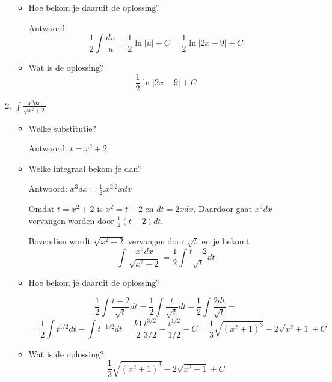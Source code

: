 \documentclass{article}
\begin{document}
\begin{enumerate}
\begin{itemize}
\item Hoe bekom je daaruit de oplossing?

Antwoord:
\[
\frac{1}{2} \int \frac{du}{u}=\frac{1}{2} \ln \vert u \vert+C=\frac{1}{2} \ln \vert 2x-9 \vert +C
\]

\item Wat is de oplossing?
\[
\frac{1}{2} \ln \vert 2x-9 \vert +C
\]

\end{itemize}

\item $\int \frac{x^3dx}{\sqrt{x^2+2}}$

\begin{itemize}
\item Welke substitutie?

Antwoord: $t=x^2+2$

\item Welke integraal bekom je dan?

Antwoord: $x^3dx=\frac{1}{2}.x^2.2xdx$

Omdat $t=x^2+2$ is $x^2=t-2$ en $dt=2xdx$.
Daardoor gaat $x^3dx$ vervangen worden door $\frac{1}{2}(t-2)dt$.

Bovendien wordt $\sqrt{x^2+2}$ vervangen door $\sqrt{t}$ en je bekomt
\[
\int \frac{x^3dx}{\sqrt{x^2+2}}=\frac{1}{2} \int \frac{t-2}{\sqrt{t}}dt
\]

\item Hoe bekom je daaruit de oplossing?

\[
\frac{1}{2} \int \frac{t-2}{\sqrt{t}}dt=\frac{1}{2} \int \frac{t}{\sqrt{t}}dt - \frac{1}{2}\int \frac{2dt}{\sqrt{t}}=
\]
\[
=\frac{1}{2} \int t^{1/2}dt - \int t^{-1/2}dt=\frac{k1}{2}\frac{t^{3/2}}{3/2}-\frac{t^{1/2}}{1/2}+C=\frac{1}{3} \sqrt{(x^2+1)^3}-2\sqrt{x^2+1}+C
\]

\item Wat is de oplossing?
\[
\frac{1}{3} \sqrt{(x^2+1)^3}-2\sqrt{x^2+1}+C
\]

\end{itemize}

\end{enumerate}
\end{document}

